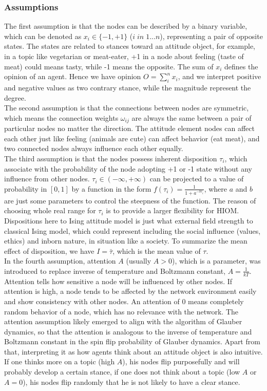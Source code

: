 \documentclass{article}
\begin{document}
\subsubsection{Assumptions}
The first assumption is that the nodes can be described by a binary variable, which can be denoted as $x_i \in \{-1,+1\}$ ($i\;in\;1...n$), representing a pair of opposite states. The states are related
to stances toward an attitude object, for example, in a topic like vegetarian or meat-eater, +1 in a node about feeling (taste of meat) could means tasty, while
-1 means the opposite. The sum of $x_i$ defines the opinion of an agent. Hence we have opinion $O = \sum_i^nx_i$, and we interpret positive and negative values as two 
contrary stance, while the magnitude represent the degree.\\

The second assumption is that the connections between nodes are symmetric, which means the connection weights $\omega_{ij}$ are always the same between a pair 
of particular nodes no matter the direction. The attitude element nodes can affect each other just like feeling (animals are cute) can affect behavior (eat meat),
and two connected nodes always influence each other equally.\\

The third assumption is that the nodes possess inherent disposition $\tau_i$, which associate with the probability of the node adopting +1 or -1 state without
any influence from other nodes. $\tau_i \in (-\infty,+\infty)$ can be projected to a value of probability in $[0,1]$ by a function in the form $f(\tau_i) = \frac{1}{1+a^{-b\tau_i}}$, where $a$ 
and $b$ are just some parameters to control the steepness of the function. The reason of choosing whole real range for $\tau_i$ is to provide a larger flexibility for HIOM. Dispositions here to Ising attitude model is just what external field strength to classical Ising model\cite{cipra1987introduction},
which could represent including the social influence (values, ethics) and inborn nature, in situation like a society. To summarize the mean effect of disposition,
we have $I = \bar{\tau}$, which is the mean value of $\tau$.\\

In the fourth assumption, attention $A$ (usually $A>0$), which is a parameter, was introduced to replace inverse of temperature and Boltzmann constant, $A = \frac{1}{kT}$. Attention tells how sensitive a node will be influenced by other nodes. If attention is
high, a node tends to be affected by the network environment easily and show consistency with other nodes. An attention of 0 means completely random behavior of a node, which has no relevance with the network.
The attention assumption likely emerged to align with the algorithm of Glauber dynamics, so that the attention is analogous to the 
inverse of temperature and Boltzmann constant in the spin flip probability of Glauber dynamics. Apart from that, interpreting it as how agents think about an attitude object
is also intuitive. If one thinks more on a topic (high $A$), his nodes flip purposefully and will probably develop a certain stance, if one does not think about a topic (low $A$ or $A=0$),
his nodes flip randomly that he is not likely to have a clear stance.
\end{document}
